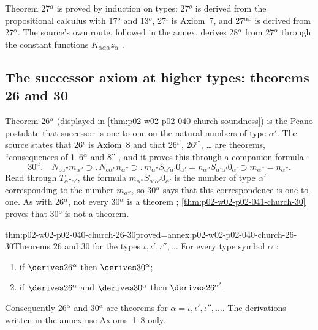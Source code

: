 Theorem 27\(^\alpha\) is proved by induction on types: 27\(^o\) is derived
from the propositional calculus with 17\(^o\) and 13\(^o\), 27\(^\iota\)
is Axiom~7, and 27\(^{\alpha\beta}\) is derived from 27\(^\alpha\).
The source's own route, followed in the annex, derives 28\(^\alpha\) from
27\(^\alpha\) through the constant functions \(K_{\alpha\alpha\alpha}z_\alpha\)
\cite[\S6, p.~65]{Church1940}.

\subsection{The successor axiom at higher types: theorems 26 and 30}

Theorem 26\(^\alpha\) (displayed in \cref{thm:p02-w02-p02-040-church-soundness})
is the Peano postulate that successor is one-to-one on the natural numbers
of type \(\alpha'\).  The source states that 26\(^\iota\) is Axiom~8 and that
26\(^{\iota'}\), 26\(^{\iota''}\), \ldots{} are theorems, ``consequences of
1--6\(^\alpha\) and 8'' \cite[\S6, p.~64]{Church1940}, and it proves this
through a companion formula \cite[\S6, p.~66]{Church1940}:
\[
 30^\alpha.\quad N_{o\alpha''}m_{\alpha''}\supset.\,N_{o\alpha''}n_{\alpha''}\supset.\,
 m_{\alpha''}S_{\alpha'\alpha'}0_{\alpha'}=n_{\alpha''}S_{\alpha'\alpha'}0_{\alpha'}
 \supset m_{\alpha''}=n_{\alpha''}.
\]
Read through \(T_{\alpha''\alpha'}\), the formula
\(m_{\alpha''}S_{\alpha'\alpha'}0_{\alpha'}\) is the number of type \(\alpha'\)
corresponding to the number \(m_{\alpha''}\), so 30\(^\alpha\) says that this
correspondence is one-to-one.  As with 26\(^\alpha\), not every 30\(^\alpha\)
is a theorem \cite[\S6, p.~66]{Church1940};
\cref{thm:p02-w02-p02-041-church-30} proves that 30\(^o\) is not a theorem.

\begin{hbtheorem}{thm:p02-w02-p02-040-church-26-30}{proved=annex:p02-w02-p02-040-church-26-30}{Theorems 26 and 30 for the types \(\iota,\iota',\iota'',\ldots\)}
For every type symbol \(\alpha\) \cite[\S6, pp.~66--67]{Church1940}:
\begin{enumerate}
 \item if \(\derives26^\alpha\) then \(\derives30^\alpha\);
 \item if \(\derives26^\alpha\) and \(\derives30^\alpha\) then
   \(\derives26^{\alpha'}\).
\end{enumerate}
Consequently 26\(^\alpha\) and 30\(^\alpha\) are theorems for
\(\alpha=\iota,\iota',\iota'',\ldots\).  The derivations written in the annex
use Axioms~1--8 only.
\end{hbtheorem}

